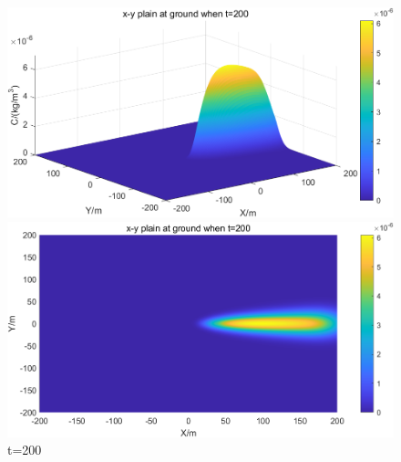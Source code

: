 \documentclass{article}
\begin{document}
	
	\begin{figure}[htbp]
		\begin{minipage}{0.49\textwidth}
			\includegraphics[width=\textwidth]{pics/default,t=200,3D.png}
		\end{minipage}
		\begin{minipage}{0.49\textwidth}
			\includegraphics[width=\textwidth]{pics/default,t=200,2D.png}
		\end{minipage}
		\caption{t=200}
		\label{fig4}
	\end{figure}
\end{document}
